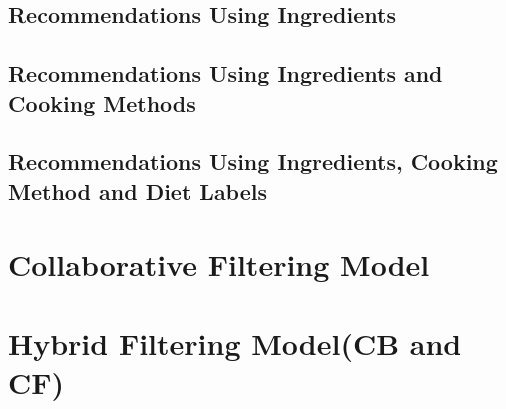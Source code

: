 \subsection{Recommendations Using Ingredients}
\subsection{Recommendations Using Ingredients and Cooking Methods}
\subsection{Recommendations Using Ingredients, Cooking Method and Diet Labels}
\section{Collaborative Filtering Model}
\section{Hybrid Filtering Model(CB and CF)}